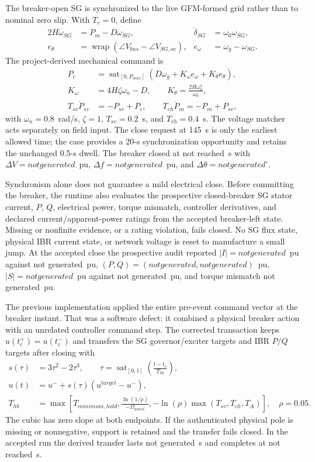 \documentclass[12pt,a4paper]{article}
\newcommand{\RunReclose}{not reached}
\newcommand{\RunHandbackDuration}{not generated}
\newcommand{\RunHandbackComplete}{not reached}
\newcommand{\RunProsI}{not generated}
\newcommand{\RunProsP}{not generated}
\newcommand{\RunProsQ}{not generated}
\newcommand{\RunProsS}{not generated}
\newcommand{\RunProsTorque}{not generated}
\newcommand{\RunProsImax}{not generated}
\newcommand{\RunProsSmax}{not generated}
\newcommand{\RunSyncDV}{not generated}
\newcommand{\RunSyncDF}{not generated}
\newcommand{\RunSyncDTheta}{not generated}
\begin{document}
The breaker-open SG is synchronized to the live GFM-formed grid rather than to nominal zero slip.
With $T_e=0$, define
\begin{align}
2H\dot\omega_{SG}&=P_m-D\omega_{SG}, & \dot\delta_{SG}&=\omega_0\omega_{SG},\\
e_\theta&=\operatorname{wrap}(\angle V_{bus}-\angle V_{SG,oc}), &
e_\omega&=\omega_g-\omega_{SG}.
\end{align}
The project-derived mechanical command is
\begin{align}
P_c&=\operatorname{sat}_{[0,P_{max}]}
\left(D\omega_g+K_\omega e_\omega+K_\theta e_\theta\right),\\
K_\omega&=4H\zeta\omega_n-D,\qquad
K_\theta=\frac{2H\omega_n^2}{\omega_0},\\
T_{sv}\dot P_{sv}&=-P_{sv}+P_c,\qquad
T_{ch}\dot P_m=-P_m+P_{sv},
\end{align}
with $\omega_n=0.8$~rad/s, $\zeta=1$, $T_{sv}=0.2$~s, and $T_{ch}=0.4$~s. The voltage matcher
acts separately on field input. The close request at 145~s is only the earliest allowed time; the
case provides a 20-s synchronization opportunity and retains the unchanged 0.5-s dwell. The
breaker closed at \RunReclose~s with
$\Delta V=\RunSyncDV$~pu, $\Delta f=\RunSyncDF$~pu, and
$\Delta\theta=\RunSyncDTheta^\circ$.

Synchronism alone does not guarantee a mild electrical close. Before committing the breaker, the
runtime also evaluates the prospective closed-breaker SG stator current, $P$, $Q$, electrical
power, torque mismatch, controller derivatives, and declared current/apparent-power ratings from
the accepted breaker-left state. Missing or nonfinite evidence, or a rating violation, fails
closed. No SG flux state, physical IBR current state, or network voltage is reset to manufacture a
small jump. At the accepted close the prospective audit reported
$|I|=\RunProsI$~pu against \RunProsImax~pu, $(P,Q)=(\RunProsP,\RunProsQ)$~pu,
$|S|=\RunProsS$~pu against \RunProsSmax~pu, and torque mismatch
\RunProsTorque~pu.

The previous implementation applied the entire pre-event command vector at the breaker instant.
That was a software defect: it combined a physical breaker action with an unrelated controller
command step. The corrected transaction keeps $u(t_c^+)=u(t_c^-)$ and transfers the SG
governor/exciter targets and IBR $P/Q$ targets after closing with
\begin{align}
s(\tau)&=3\tau^2-2\tau^3,\qquad
\tau=\operatorname{sat}_{[0,1]}\!\left(\frac{t-t_c}{T_{hb}}\right),\\
u(t)&=u^-+s(\tau)(u^{target}-u^-),\\
T_{hb}&=\max\!\left[T_{minimum,hold},
\frac{\ln(1/\rho)}{-\Omega_{worst}},
-\ln(\rho)\max(T_{sv},T_{ch},T_A)\right],\quad \rho=0.05.
\end{align}
The cubic has zero slope at both endpoints. If the authenticated physical pole is missing or
nonnegative, support is retained and the transfer fails closed. In the accepted run the derived
transfer lasts \RunHandbackDuration~s and completes at \RunHandbackComplete~s.
\end{document}
